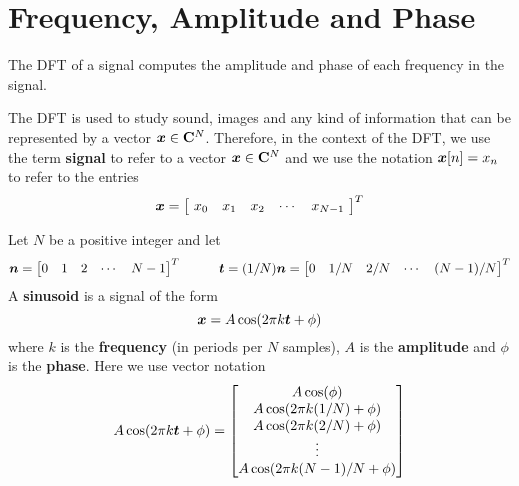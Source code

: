\section{Frequency, Amplitude and Phase}

\begin{bigidea}
The DFT of a signal computes the amplitude and phase of each frequency in the signal.
\end{bigidea}

\begin{definition}
The DFT is used to study sound, images and any kind of information that can be represented by a vector $\boldsymbol{x} \in \mathbf{C}^N$. Therefore, in the context of the DFT, we use the term {\bf signal} to refer to a vector $\boldsymbol{x} \in \mathbf{C}^N$ and we use the notation $\boldsymbol{x}[n] = x_n$ to refer to the entries
$$
\bs{x} = \begin{bmatrix} \ x_0 & x_1 & x_2 & \cdots & x_{N-1} \ \end{bmatrix}^T
$$
\end{definition}

\begin{definition}
Let $N$ be a positive integer and let
$$
\bs{n} = \begin{bmatrix} 0 & 1 & 2 & \cdots & N-1 \end{bmatrix}^T
\hspace{10mm}
\bs{t} = (1/N) \bs{n} = \begin{bmatrix} 0 & 1/N & 2/N & \cdots & (N-1)/N \end{bmatrix}^T
$$ 
A {\bf sinusoid} is a signal of the form
$$
\boldsymbol{x} = A \cos(2\pi k \boldsymbol{t} + \phi)
$$
where $k$ is the {\bf frequency} (in periods per $N$ samples), $A$ is the {\bf amplitude} and $\phi$ is the {\bf phase}. Here we use vector notation
$$
A \cos(2\pi k \boldsymbol{t} + \phi) = \begin{bmatrix} A \cos(\phi) \\ A \cos(2\pi k (1/N) + \phi) \\ A \cos(2\pi k (2/N) + \phi) \\ \vdots \\ A \cos(2\pi k (N-1)/N + \phi) \end{bmatrix}
$$
\end{definition}

